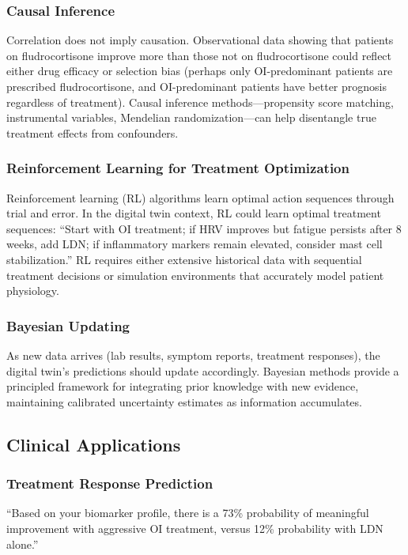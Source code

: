 \subsubsection{Causal Inference}
Correlation does not imply causation. Observational data showing that patients on fludrocortisone improve more than those not on fludrocortisone could reflect either drug efficacy or selection bias (perhaps only OI-predominant patients are prescribed fludrocortisone, and OI-predominant patients have better prognosis regardless of treatment). Causal inference methods---propensity score matching, instrumental variables, Mendelian randomization---can help disentangle true treatment effects from confounders.

\subsubsection{Reinforcement Learning for Treatment Optimization}
Reinforcement learning (RL) algorithms learn optimal action sequences through trial and error. In the digital twin context, RL could learn optimal treatment sequences: ``Start with OI treatment; if HRV improves but fatigue persists after 8 weeks, add LDN; if inflammatory markers remain elevated, consider mast cell stabilization.'' RL requires either extensive historical data with sequential treatment decisions or simulation environments that accurately model patient physiology.

\subsubsection{Bayesian Updating}
As new data arrives (lab results, symptom reports, treatment responses), the digital twin's predictions should update accordingly. Bayesian methods provide a principled framework for integrating prior knowledge with new evidence, maintaining calibrated uncertainty estimates as information accumulates.

\subsection{Clinical Applications}

\subsubsection{Treatment Response Prediction}
``Based on your biomarker profile, there is a 73\% probability of meaningful improvement with aggressive OI treatment, versus 12\% probability with LDN alone.''

